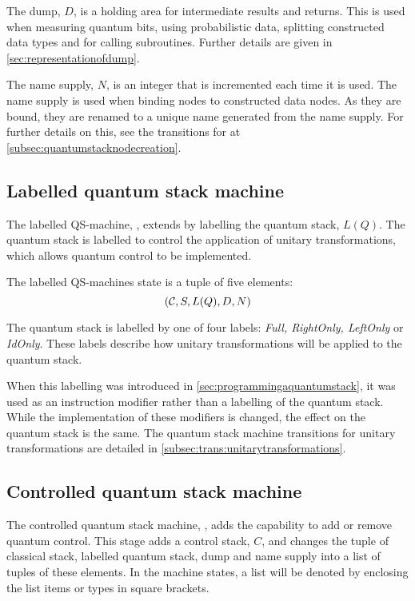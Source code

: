 The dump, $D$, is a holding area for intermediate results and returns. This
is used when measuring quantum bits,  using probabilistic data, 
splitting constructed data types and for calling subroutines. Further
details are given in \vref{sec:representationofdump}.


The name supply, $N$, is an integer that is incremented each
time it is used. The name supply is used when binding nodes to 
constructed data nodes. As they are bound, they are renamed to a unique name
generated from the name supply. For further details on this, see 
the transitions for  at \vref{subsec:quantumstacknodecreation}.

\subsection{Labelled quantum stack machine}\label{subsec:labelledmachinestate}

The labelled QS-machine, \lbms, extends  \bms{} by
labelling the quantum stack, $L(Q)$. The quantum stack is labelled to 
control the application of
 unitary transformations, which allows quantum control to
be implemented.

The labelled QS-machines state is a tuple of five elements:
\begin{equation}
(\mathcal{C},S,L(Q),D,N)\label{eq:minimalmachinestateplus}
\end{equation}

The quantum stack is labelled by one of four labels: 
\emph{Full, RightOnly, LeftOnly} or 
\emph{IdOnly}. These labels 
describe how unitary transformations will be applied to  the quantum stack.

When this labelling was introduced in \ref{sec:programmingaquantumstack}, it 
was used as an instruction modifier rather than a labelling of the
quantum stack. While the implementation of these modifiers  is
changed, the effect on the quantum stack is the same. The quantum stack
machine transitions for unitary transformations are detailed 
in  \vref{subsec:trans:unitarytransformations}.


\subsection{Controlled quantum stack machine}\label{subsec:controlledmachinestate}

The controlled quantum stack machine, \cms, adds the capability to 
 add or remove quantum control.
This stage  adds a control stack, $C$, and changes the 
 tuple of classical stack, labelled quantum stack, dump
and name supply into a  list of tuples of these elements. In the 
machine states, a list will be denoted by enclosing the list items
or types in square brackets.


